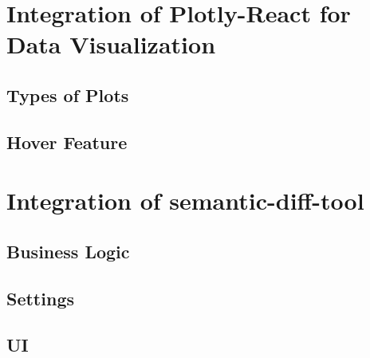 \section{Integration of Plotly-React for Data Visualization}
\subsection{Types of Plots}
\subsection{Hover Feature}

\section{Integration of semantic-diff-tool}
\subsection{Business Logic}
\subsection{Settings}
\subsection{UI}